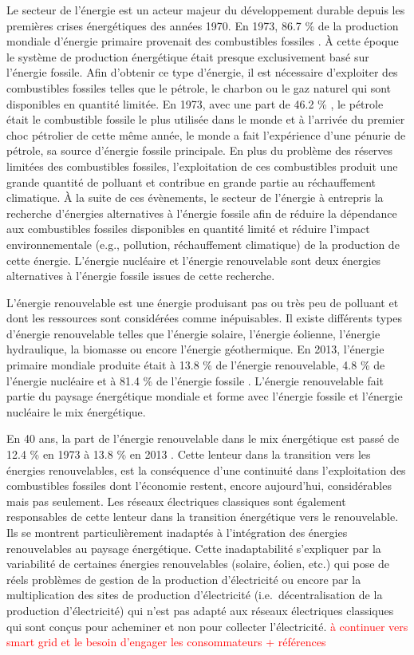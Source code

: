 \documentclass[10pt,a5paper,twoside]{article}
\begin{document}
Le secteur de l'énergie est un acteur majeur du développement durable
depuis les premières crises énergétiques des années 1970. En 1973, 86.7
\% de la production mondiale d'énergie primaire provenait des
combustibles fossiles \citep{iea2015key}. À cette époque le système de
production énergétique était presque exclusivement basé sur l'énergie
fossile. Afin d'obtenir ce type d'énergie, il est nécessaire d'exploiter
des combustibles fossiles telles que le pétrole, le charbon ou le gaz
naturel qui sont disponibles en quantité limitée. En 1973, avec une part
de 46.2 \% \citep{iea2015key}, le pétrole était le combustible fossile
le plus utilisée dans le monde et à l'arrivée du premier choc pétrolier
de cette même année, le monde a fait l'expérience d'une pénurie de
pétrole, sa source d'énergie fossile principale. En plus du problème des
réserves limitées des combustibles fossiles, l'exploitation de ces
combustibles produit une grande quantité de polluant et contribue en
grande partie au réchauffement climatique. À la suite de ces évènements,
le secteur de l'énergie à entrepris la recherche d'énergies alternatives
à l'énergie fossile afin de réduire la dépendance aux combustibles
fossiles disponibles en quantité limité et réduire l'impact
environnementale (e.g., pollution, réchauffement climatique) de la
production de cette énergie. L'énergie nucléaire et l'énergie
renouvelable sont deux énergies alternatives à l'énergie fossile issues
de cette recherche.

L'énergie renouvelable est une énergie produisant pas ou très peu de
polluant et dont les ressources sont considérées comme inépuisables. Il
existe différents types d'énergie renouvelable telles que l'énergie
solaire, l'énergie éolienne, l'énergie hydraulique, la biomasse ou
encore l'énergie géothermique. En 2013, l'énergie primaire mondiale
produite était à 13.8 \% de l'énergie renouvelable, 4.8 \% de l'énergie
nucléaire et à 81.4 \% de l'énergie fossile \citep{iea2015key}.
L'énergie renouvelable fait partie du paysage énergétique mondiale et
forme avec l'énergie fossile et l'énergie nucléaire le mix énergétique.

En 40 ans, la part de l'énergie renouvelable dans le mix énergétique est
passé de 12.4 \% en 1973 à 13.8 \% en 2013 \citep{iea2015key}. Cette
lenteur dans la transition vers les énergies renouvelables, est la
conséquence d'une continuité dans l'exploitation des combustibles
fossiles dont l'économie restent, encore aujourd'hui, considérables mais
pas seulement. Les réseaux électriques classiques sont également
responsables de cette lenteur dans la transition énergétique vers le
renouvelable. Ils se montrent particulièrement inadaptés à l'intégration
des énergies renouvelables au paysage énergétique. Cette inadaptabilité
s'expliquer par la variabilité de certaines énergies renouvelables
(solaire, éolien, etc.) qui pose de réels problèmes de gestion de la
production d'électricité ou encore par la multiplication des sites de
production d'électricité (i.e.~décentralisation de la production
d'électricité) qui n'est pas adapté aux réseaux électriques classiques
qui sont conçus pour acheminer et non pour collecter l'électricité.
\textcolor{red}{à continuer vers smart grid et le besoin d'engager les consommateurs + références}
\end{document}
